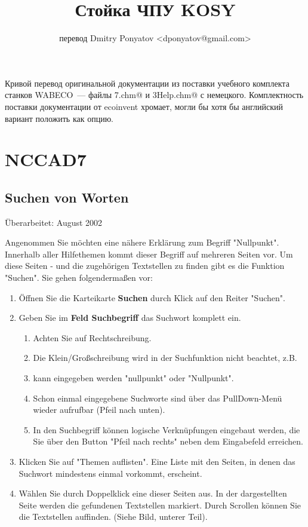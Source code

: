 \documentclass[a4paper]{book}
\title{Стойка ЧПУ KOSY}
\author{перевод Dmitry Ponyatov <dponyatov@gmail.com>}
\begin{document}
\maketitle

Кривой перевод оригинальной документации из поставки учебного комплекта станков
WABECO~--- файлы \verb@nccad7.chm@ и \verb@ZSE3Help.chm@ с немецкого.
Комплектность поставки документации от ecoinvent хромает, могли бы хотя бы
английский вариант положить как опцию.

\tableofcontents

\part{NCCAD7}


\chapter{Suchen von Worten} 

Überarbeitet: August 2002

\bigskip 

Angenommen Sie möchten eine nähere Erklärung zum Begriff "Nullpunkt". Innerhalb aller 
Hilfethemen kommt dieser Begriff auf mehreren Seiten vor. Um diese Seiten - und die 
zugehörigen Textstellen zu finden gibt es die Funktion "Suchen". Sie gehen folgendermaßen 
vor:
\begin{enumerate}
  \item Öffnen Sie die Karteikarte \textbf{Suchen} durch Klick auf den Reiter
  "Suchen".
  \item Geben Sie im \textbf{Feld Suchbegriff} das Suchwort komplett ein. 
\begin{enumerate}
  \item Achten Sie auf Rechtschreibung. 
  \item Die Klein/Großschreibung wird in der Suchfunktion nicht beachtet, z.B.
  \item kann eingegeben werden "nullpunkt" oder "Nullpunkt".
  \item Schon einmal eingegebene Suchworte sind über das PullDown-Menü wieder
  aufrufbar (Pfeil nach unten).
  \item In den Suchbegriff können logische Verknüpfungen eingebaut werden, die
Sie über den Button "Pfeil nach rechts" neben dem Eingabefeld erreichen.
\end{enumerate}
  \item Klicken Sie auf "Themen auflisten". Eine Liste mit den Seiten, in denen
das Suchwort mindestens einmal vorkommt, erscheint.
  \item Wählen Sie durch Doppelklick eine dieser Seiten aus. In der
dargestellten Seite werden die gefundenen Textstellen markiert. Durch Scrollen können
 Sie die Textstellen auffinden. (Siehe Bild, unterer Teil).
\end{enumerate}
\end{document}

